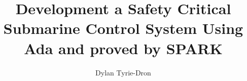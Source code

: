 \author{Dylan Tyrie-Dron}
\title{Development a Safety Critical Submarine Control System Using Ada and proved by SPARK}

\maketitle